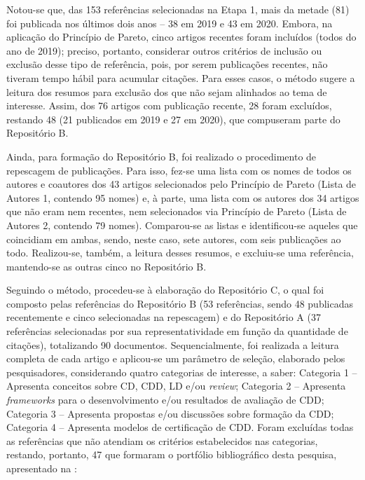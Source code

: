 \documentclass[portuguese]{textolivre}
\begin{document}
Notou-se que, das 153 referências selecionadas na Etapa 1, mais da metade (81) foi publicada nos últimos dois anos – 38 em 2019 e 43 em 2020. Embora, na aplicação do Princípio de Pareto, cinco artigos recentes foram incluídos (todos do ano de 2019); preciso, portanto, considerar outros critérios de inclusão ou exclusão desse tipo de referência, pois, por serem publicações recentes, não tiveram tempo hábil para acumular citações. Para esses casos, o método sugere a leitura dos resumos para exclusão dos que não sejam alinhados ao tema de interesse. Assim, dos 76 artigos com publicação recente, 28 foram excluídos, restando 48 (21 publicados em 2019 e 27 em 2020), que compuseram parte do Repositório B.

Ainda, para formação do Repositório B, foi realizado o procedimento de repescagem de publicações. Para isso, fez-se uma lista com os nomes de todos os autores e coautores dos 43 artigos selecionados pelo Princípio de Pareto (Lista de Autores 1, contendo 95 nomes) e, à parte, uma lista com os autores dos 34 artigos que não eram nem recentes, nem selecionados via Princípio de Pareto (Lista de Autores 2, contendo 79 nomes). Comparou-se as listas e identificou-se aqueles que coincidiam em ambas, sendo, neste caso, sete autores, com seis publicações ao todo. Realizou-se, também, a leitura desses resumos, e excluiu-se uma referência, mantendo-se as outras cinco no Repositório B.

Seguindo o método, procedeu-se à elaboração do Repositório C, o qual foi composto pelas referências do Repositório B (53 referências, sendo 48 publicadas recentemente e cinco selecionadas na repescagem) e do Repositório A (37 referências selecionadas por sua representatividade em função da quantidade de citações), totalizando 90 documentos. Sequencialmente, foi realizada a leitura completa de cada artigo e aplicou-se um parâmetro de seleção, elaborado pelos pesquisadores, considerando quatro categorias de interesse, a saber: Categoria 1 – Apresenta conceitos sobre CD, CDD, LD e/ou \textit{review}; Categoria 2 – Apresenta \textit{frameworks} para o desenvolvimento e/ou resultados de avaliação de CDD; Categoria 3 – Apresenta propostas e/ou discussões sobre formação da CDD; Categoria 4 – Apresenta modelos de certificação de CDD. Foram excluídas todas as referências que não atendiam os critérios estabelecidos nas categorias, restando, portanto, 47 que formaram o portfólio bibliográfico desta pesquisa, apresentado na :
\end{document}
